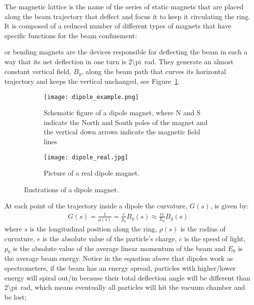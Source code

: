     The magnetic lattice is the name of the series of static magnets that are placed along the beam trajectory that deflect and focus it to keep it circulating the ring. It is composed of a reduced number of different types of magnets that have specific functions for the beam confinement:
    \begin{description}[align=left]
        \item[Dipoles:] or bending magnets are the devices responsible for deflecting the beam in such a way that its net deflection in one turn is \SI{2\pi}{\radian}. They generate an almost constant vertical field, $B_y$, along the beam path that curves its horizontal trajectory and keeps the vertical unchanged, see Figure~\ref{fig:dipole}.
        \begin{figure}[t!]
            \centering
            \begin{subfigure}[c]{0.45\textwidth}
                \texttt{[image: dipole\_example.png]}
                \caption{Schematic figure of a dipole magnet, where N and S indicate the North and South poles of the magnet and the vertical down arrows indicate the magnetic field lines}
            \end{subfigure}\hfill
            \begin{subfigure}[c]{0.5\textwidth}
                \texttt{[image: dipole\_real.jpg]}
                \caption{Picture of a real dipole magnet.}
            \end{subfigure}
            \caption{Ilustrations of a dipole magnet.}
            \label{fig:dipole}
        \end{figure}
        At each point of the trajectory inside a dipole the curvature, $G(s)$, is given by:
        \begin{align}\label{eq:curvature_dipole}
            G(s) = \frac{1}{\rho(s)} = \frac{e}{p_0}B_y(s) \approx \frac{ec}{E_0}B_y(s)
        \end{align}
        where $s$ is the longitudinal position along the ring, $\rho(s)$ is the radius of curvature, $e$ is the absolute value of the particle's charge, $c$ is the speed of light, $p_0$ is the absolute value of the average linear momentum of the beam and $E_0$ is the average beam energy. Notice in the equation above that dipoles work as spectrometers, if the beam has an energy spread, particles with higher/lower energy will spiral out/in because their total deflection angle will be different than \SI{2\pi}{\radian}, which means eventually all particles will hit the vacuum chamber and be lost;

\end{description}
